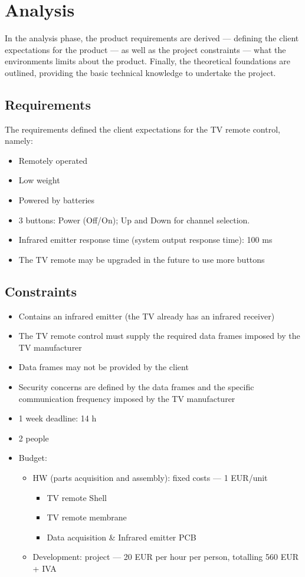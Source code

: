 \chapter{Analysis}
\label{ch:analysis}
In the analysis
phase, the product requirements are derived --- defining the client expectations
for the product --- as well as the project constraints --- what the environments
limits about the product. Finally, the theoretical foundations are outlined,
providing the basic technical knowledge to undertake the project.

\section{Requirements}
\label{sec:requirements}
The requirements defined the client expectations for the TV remote control,
namely:
\begin{itemize}
\item Remotely operated
\item Low weight
\item Powered by batteries
\item 3 buttons: Power (Off/On); Up and Down for channel selection.
\item Infrared emitter response time (system output response time): 100 ms
\item The TV remote may be upgraded in the future to use more buttons
\end{itemize}

\section{Constraints}
\label{sec:constraints}
\begin{itemize}
\item Contains an infrared emitter (the TV already has an infrared receiver)
\item The TV remote control must supply the required data frames imposed by the TV
  manufacturer
\item Data frames may not be provided by the client
\item Security concerns are defined by the data frames and the specific
  communication frequency imposed by the TV manufacturer
\item 1 week deadline: 14 h
\item 2 people
\item Budget:
  \begin{itemize}
  \item HW (parts acquisition and assembly): fixed costs --- 1 EUR/unit
    \begin{itemize}
    \item TV remote Shell
    \item TV remote membrane
    \item Data acquisition \& Infrared emitter PCB
    \end{itemize}
  \item Development: project --- 20 EUR per hour per person, totalling 560 EUR +
    IVA
  \end{itemize}
\end{itemize}


